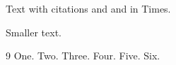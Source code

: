\documentclass{article}
\begin{document}
Text with citations \cite{a,c,e} and \cite{f,a} and \cite[p.~11]{a} in Times.

{\small Smaller \cite{a,c} text.}

\begin{thebibliography}{9}
 One.
 Two.
 Three.
 Four.
 Five.
 Six.
\end{thebibliography}
\end{document}
